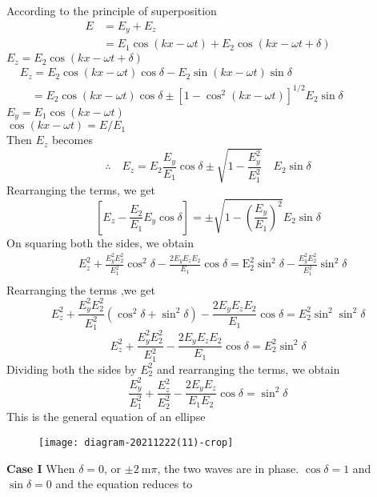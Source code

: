  According to the principle of superposition
 $$
 \begin{aligned}
 E &=E_{y}+E_{z} \\
 &=E_{1} \cos (k x-\omega t)+E_{2} \cos (k x-\omega t+\delta)
 \end{aligned}
 $$
 $E_{z}=E_{2} \cos (k x-\omega t+\delta)$\\
 $\begin{aligned}
 	&E_{z}=E_{2} \cos (k x-\omega t) \cos \delta-E_{2} \sin (k x-\omega t) \sin \delta \\
 	&\quad=E_{2} \cos (k x-\omega t) \cos \delta \pm\left[1-\cos ^{2}(k x-\omega t)\right]^{1 / 2} E_{2} \sin \delta
 \end{aligned}$\\
 $E_{y}=E_{1} \cos (k x-\omega t)$\\
$ \cos (k x-\omega t)=E / E_{1}$\\
Then $E_z$ becomes\\
$$\therefore \quad E_{z}=E_{2} \frac{E_{y}}{E_{1}} \cos \delta \pm \sqrt{1-\frac{E_{y}^{2}}{E_{1}^{2}}} \quad E_{2} \sin \delta$$
Rearranging the terms, we get
$$
\left[E_{z}-\frac{E_{2}}{E_{1}} E_{y} \cos \delta\right]=\pm \sqrt{1-\left(\frac{E_{y}}{E_{1}}\right)^{2}} E_{2} \sin \delta
$$
On squaring both the sides, we obtain
$$
\begin{aligned}
&E_{z}^{2}+\frac{E_{y}^{2} E_{2}^{2}}{E_{1}^{2}} \cos ^{2} \delta-\frac{2 E_{y} E_{z} E_{2}}{E_{1}} \cos \delta=\mathrm{E}_{2}^{2} \sin ^{2} \delta-\frac{E_{y}^{2} E_{2}^{2}}{E_{1}^{2}} \sin ^{2} \delta \\
\end{aligned}
$$
Rearranging the terms ,we get
$$E_z^2+\frac{E_y^2E_2^2}{E_1^2}\left( \cos^2\delta+\sin^2\delta\right) -\frac{2E_yE_zE_2}{E_1}\cos\delta=E_2^2\sin^2\sin^2\delta$$
$$E_{z}^{2}+\frac{E_{y}^{2} E_{2}^{2}}{E_{1}^{2}}-\frac{2 E_{y} E_{z} E_{2}}{E_{1}} \cos \delta=E_{2}^{2} \sin ^{2} \delta$$
Dividing both the sides by $E_{2}^{2}$ and rearranging the terms, we obtain
$$
\frac{E_{y}^{2}}{E_{1}^{2}}+\frac{E_{z}^{2}}{E_{2}^{2}}-\frac{2 E_{y} E_{z}}{E_{1} E_{2}} \cos \delta=\sin ^{2} \delta
$$
This is the general equation of an ellipse\\
\begin{figure}[H]
	\centering
	\texttt{[image: diagram-20211222(11)-crop]}
	\caption{}
	\label{}
\end{figure}
\textbf{Case I}
When $\delta=0$, or $\pm 2 \mathrm{~m} \pi$, the two waves are in phase.
$\cos \delta=1$ and $\sin \delta=0$ and the equation reduces to

